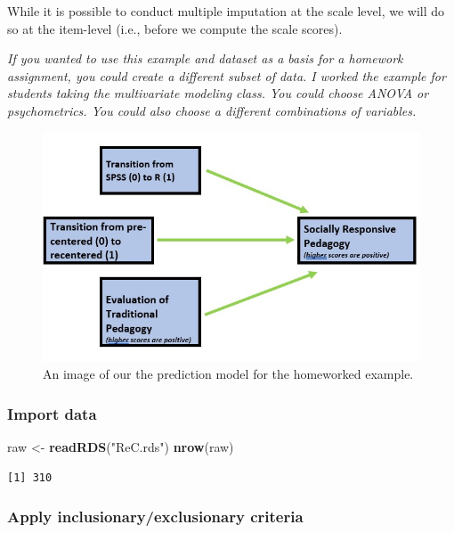 \documentclass[
  11pt,
]{book}
\newenvironment{Shaded}{\begin{snugshade}}{\end{snugshade}}
\newcommand{\FunctionTok}[1]{\textcolor[rgb]{0.27,0.27,0.27}{\textbf{#1}}}
\newcommand{\NormalTok}[1]{#1}
\newcommand{\OtherTok}[1]{\textcolor[rgb]{0.37,0.37,0.37}{#1}}
\newcommand{\StringTok}[1]{\textcolor[rgb]{0.5,0.5,0.5}{#1}}
\begin{document}
While it is possible to conduct multiple imputation at the scale level, we will do so at the item-level (i.e., before we compute the scale scores).

\emph{If you wanted to use this example and dataset as a basis for a homework assignment, you could create a different subset of data. I worked the example for students taking the multivariate modeling class. You could choose ANOVA or psychometrics. You could also choose a different combinations of variables.}

\begin{figure}
\centering
\includegraphics{Worked_Examples/images/homeworked_model.jpg}
\caption{An image of our the prediction model for the homeworked example.}
\end{figure}

\hypertarget{import-data-1}{%
\subsubsection*{Import data}\label{import-data-1}}


\begin{Shaded}
\begin{Highlighting}[]
\NormalTok{raw }\OtherTok{\textless{}{-}} \FunctionTok{readRDS}\NormalTok{(}\StringTok{"ReC.rds"}\NormalTok{)}
\FunctionTok{nrow}\NormalTok{(raw)}
\end{Highlighting}
\end{Shaded}

\begin{verbatim}
[1] 310
\end{verbatim}

\hypertarget{apply-inclusionaryexclusionary-criteria}{%
\subsubsection*{Apply inclusionary/exclusionary criteria}\label{apply-inclusionaryexclusionary-criteria}}
\end{document}
